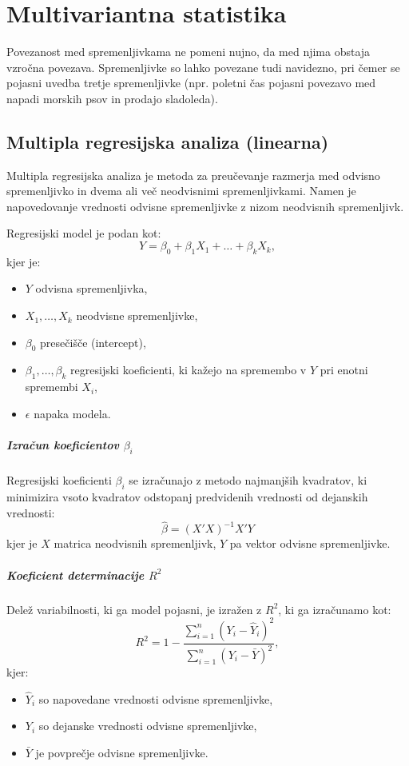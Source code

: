\chapter{Multivariantna statistika}

Povezanost med spremenljivkama ne pomeni nujno, da med njima obstaja vzročna povezava. Spremenljivke so lahko povezane tudi navidezno, pri čemer se pojasni uvedba tretje spremenljivke (npr. poletni čas pojasni povezavo med napadi morskih psov in prodajo sladoleda).

\section{Multipla regresijska analiza (linearna)}

Multipla regresijska analiza je metoda za preučevanje razmerja med odvisno spremenljivko in dvema ali več neodvisnimi spremenljivkami. Namen je napovedovanje vrednosti odvisne spremenljivke z nizom neodvisnih spremenljivk.

Regresijski model je podan kot:
\[Y = \beta_0 + \beta_1 X_1 + \ldots + \beta_k X_k,\]
kjer je:
\begin{itemize}
    \item $Y$ odvisna spremenljivka,
    \item $X_1, \ldots, X_k$ neodvisne spremenljivke,
    \item $\beta_0$ presečišče (intercept),
    \item $\beta_1, \ldots, \beta_k$ regresijski koeficienti, ki kažejo na spremembo v $Y$ pri enotni spremembi $X_i$,
    \item $\epsilon$ napaka modela.
\end{itemize}

\paragraph{Izračun koeficientov $\beta_i$}
Regresijski koeficienti $\beta_i$ se izračunajo z metodo najmanjših kvadratov, ki minimizira vsoto kvadratov odstopanj predvidenih vrednosti od dejanskih vrednosti:
\[
\hat{\beta} = (X'X)^{-1}X'Y
\]
kjer je $X$ matrica neodvisnih spremenljivk, $Y$ pa vektor odvisne spremenljivke.

\paragraph{Koeficient determinacije $R^2$}
Delež variabilnosti, ki ga model pojasni, je izražen z $R^2$, ki ga izračunamo kot:
\[R^2 = 1 - \frac{\sum_{i=1}^{n} (Y_i - \hat{Y}_i)^2}{\sum_{i=1}^{n} (Y_i - \bar{Y})^2},\]
kjer:
\begin{itemize}
    \item $\hat{Y}_i$ so napovedane vrednosti odvisne spremenljivke,
    \item $Y_i$ so dejanske vrednosti odvisne spremenljivke,
    \item $\bar{Y}$ je povprečje odvisne spremenljivke.
\end{itemize}

